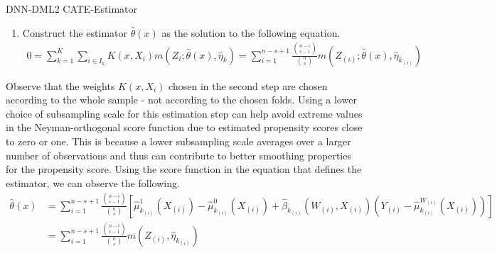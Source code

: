 \begin{boxD}
\begin{dfn}{DNN-DML2 CATE-Estimator}
\begin{enumerate}
			\item Construct the estimator $\hat{\theta}\left(x\right)$
			      as the solution to the following equation.
			      \begin{equation}
				      \begin{aligned}
					      0 = \sum_{k = 1}^{K} \sum_{i \in I_k} K(x, X_{i}) m\left(Z_{i}; \hat{\theta}\left(x\right), \hat{\eta}_{k}\right)
					      = \sum_{i = 1}^{n - s + 1} \frac{\binom{n-i}{s-1}}{\binom{n}{s}} m\left(Z_{(i)}; \hat{\theta}\left(x\right),\hat{\eta}_{k_{(i)}}\right)
				      \end{aligned}
			      \end{equation}
		\end{enumerate}
	\end{dfn}
\end{boxD}
Observe that the weights $K(x, X_{i})$ chosen in the second step are chosen according to the whole sample - not according to the chosen folds.
Using a lower choice of subsampling scale for this estimation step can help avoid extreme values in the Neyman-orthogonal score function due to estimated propensity scores close to zero or one.
This is because a lower subsampling scale averages over a larger number of observations and thus can contribute to better smoothing properties for the propensity score.
Using the score function in the equation that defines the estimator, we can observe the following.
\begin{equation}
	\begin{aligned}
		\hat{\theta}\left(x\right) 
        & = \sum_{i = 1}^{n - s + 1} \frac{\binom{n-i}{s-1}}{\binom{n}{s}}
		\left[\hat{\mu}_{k_{(i)}}^{1}\left(X_{(i)}\right) - \hat{\mu}_{k_{(i)}}^{0}\left(X_{(i)}\right) + \hat{\beta}_{k_{(i)}}\left(W_{(i)}, X_{(i)}\right)\left(Y_{(i)} - \hat{\mu}^{W_{(i)}}_{k_{(i)}}\left(X_{(i)}\right)\right)\right] \\
        & = \sum_{i = 1}^{n - s + 1} \frac{\binom{n-i}{s-1}}{\binom{n}{s}} m(Z_{(i)}, \hat{\eta}_{k_{(i)}})
	\end{aligned}
\end{equation}
